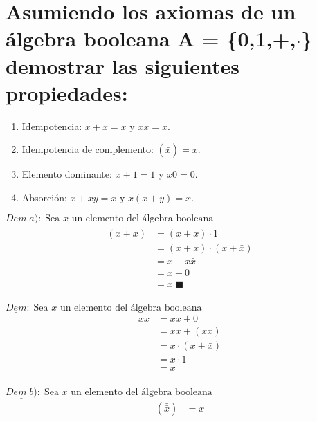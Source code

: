 \chapter*{Asumiendo los axiomas de un álgebra booleana  A = \{{0,1},+,$\cdot$\} demostrar las siguientes propiedades:}
\begin{enumerate}[label=\alph*)]
	\item Idempotencia: $x+x = x $ y $ xx = x$.
	\item Idempotencia de complemento:  $(\bar{\bar{x}})= x$.
	\item Elemento dominante: $x+1 = 1$ y $x0 = 0$.
	\item Absorción: $x+xy = x$ y $x(x+y) = x$.
\end{enumerate}
\begin{multicols}{2}
	\noindent
	$\underline{Dem \;a)}:\; \text{Sea $x$ un elemento del álgebra booleana}$
	\begin{align*}
		(x+x) & =(x+x)\cdot 1           \\
		      & =(x+x)\cdot (x+\bar{x}) \\
		      & =x + x\bar{x}           \\
		      & =x + 0                  \\
		      & =x\; \blacksquare       \\
	\end{align*}

	\columnbreak

	\noindent
	$\underline{Dem}:\; \text{Sea $x$ un elemento del álgebra booleana}$
	\begin{align*}
		xx & =xx+0              \\
		   & =xx+(x\bar{x})     \\
		   & =x\cdot(x+\bar{x}) \\
		   & =x\cdot 1          \\
		   & =x                 \\
	\end{align*}
\end{multicols}
\begin{multicols}{2}
	\noindent
	$\underline{Dem \;b)}:\; \text{Sea $x$ un elemento del álgebra booleana}$
	\begin{align*}
		(\bar{\bar{x}}) & = x \\
	\end{align*}
\end{multicols}

